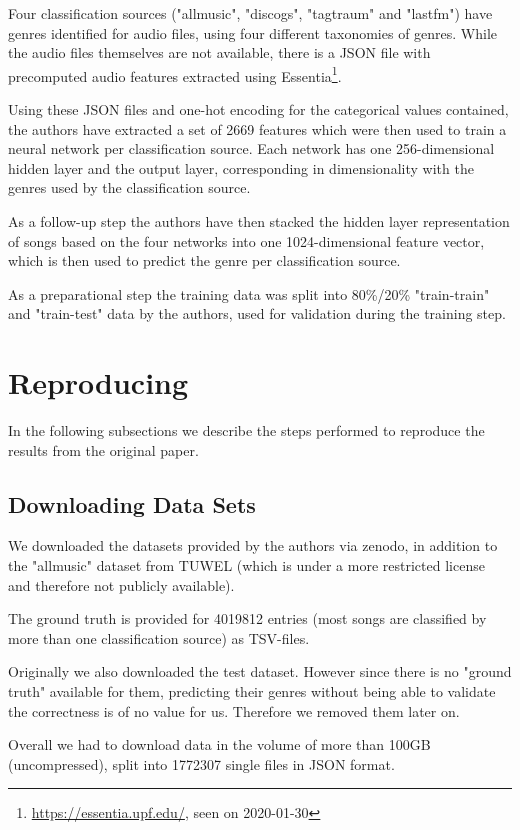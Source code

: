 \documentclass[sigconf,nonacm]{acmart}
\begin{document}
Four classification sources ("allmusic", "discogs", "tagtraum" and "lastfm")
have genres identified for audio files, using four different taxonomies
of genres.
While the audio files themselves are not available, there is a JSON
file with precomputed audio features extracted using 
Essentia\footnote{\url{https://essentia.upf.edu/}, seen on 2020-01-30}.

Using these JSON files and one-hot encoding for the categorical
values contained,
the authors have extracted a set of 2669 features which were
then used to train a neural network per classification source.
Each network has one 256-dimensional hidden layer and the output layer,
corresponding in dimensionality with the genres used by the classification
source. 

As a follow-up step the authors have then stacked the hidden
layer representation of songs based on the four networks into
one 1024-dimensional feature vector, which is then used to predict
the genre per classification source.

As a preparational step the training data was split into 80\%/20\%
"train-train" and "train-test" data by the authors,
used for validation during the training step.

\section{Reproducing}

In the following subsections we describe the steps performed
to reproduce the results from the original paper.

\subsection{Downloading Data Sets}

We downloaded the datasets provided by the authors via zenodo,
in addition to the "allmusic" dataset from TUWEL
(which is under a more restricted license and therefore not
publicly available).

The ground truth is provided for 4019812 entries (most songs are
classified by more than one classification source) as TSV-files.

Originally we also downloaded the test dataset.
However since there is no "ground truth" available for them, predicting
their genres without being able to validate the correctness is of
no value for us.
Therefore we removed them later on.

Overall we had to download data in the volume of
more than 100GB (uncompressed),
split into 1772307 single files in JSON format.
\end{document}
